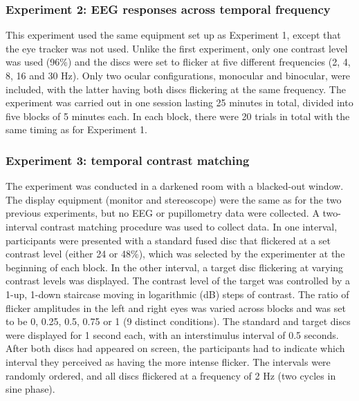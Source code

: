 \documentclass[
]{article}
\begin{document}
\hypertarget{experiment-2-eeg-responses-across-temporal-frequency}{%
\subsubsection{Experiment 2: EEG responses across temporal frequency}\label{experiment-2-eeg-responses-across-temporal-frequency}}

This experiment used the same equipment set up as Experiment 1, except that the eye tracker was not used. Unlike the first experiment, only one contrast level was used (96\%) and the discs were set to flicker at five different frequencies (2, 4, 8, 16 and 30 Hz). Only two ocular configurations, monocular and binocular, were included, with the latter having both discs flickering at the same frequency. The experiment was carried out in one session lasting 25 minutes in total, divided into five blocks of 5 minutes each. In each block, there were 20 trials in total with the same timing as for Experiment 1.

\hypertarget{experiment-3-temporal-contrast-matching}{%
\subsubsection{Experiment 3: temporal contrast matching}\label{experiment-3-temporal-contrast-matching}}

The experiment was conducted in a darkened room with a blacked-out window. The display equipment (monitor and stereoscope) were the same as for the two previous experiments, but no EEG or pupillometry data were collected. A two-interval contrast matching procedure was used to collect data. In one interval, participants were presented with a standard fused disc that flickered at a set contrast level (either 24 or 48\%), which was selected by the experimenter at the beginning of each block. In the other interval, a target disc flickering at varying contrast levels was displayed. The contrast level of the target was controlled by a 1-up, 1-down staircase moving in logarithmic (dB) steps of contrast. The ratio of flicker amplitudes in the left and right eyes was varied across blocks and was set to be 0, 0.25, 0.5, 0.75 or 1 (9 distinct conditions). The standard and target discs were displayed for 1 second each, with an interstimulus interval of 0.5 seconds. After both discs had appeared on screen, the participants had to indicate which interval they perceived as having the more intense flicker. The intervals were randomly ordered, and all discs flickered at a frequency of 2 Hz (two cycles in sine phase).
\end{document}
